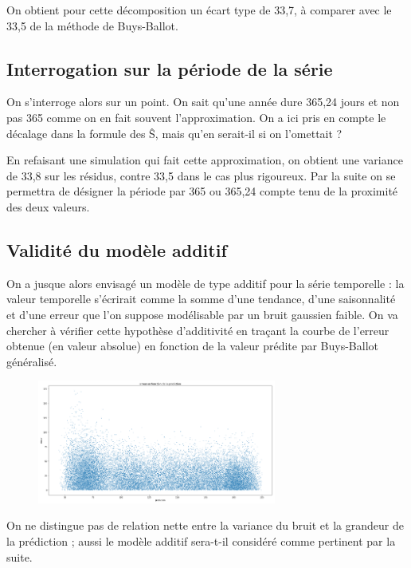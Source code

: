 \documentclass[../report.tex]{subfiles}
\begin{document}
\par On obtient pour cette décomposition un écart type de 33,7, à comparer avec le 33,5 de la méthode de Buys-Ballot.

\subsection{Interrogation sur la période de la série}

\par On s’interroge alors sur un point. On sait qu’une année dure 365,24 jours et non pas 365 comme on en fait souvent l’approximation. On a ici pris en compte le décalage dans la formule des Ŝ, mais qu’en serait-il si on l’omettait ? 

\par En refaisant une simulation qui fait cette approximation, on obtient une variance de 33,8 sur les résidus, contre 33,5 dans le cas plus rigoureux. Par la suite on se permettra de désigner la période par 365 ou 365,24 compte tenu de la proximité des deux valeurs.

\subsection{Validité du modèle additif}

\par On a jusque alors envisagé un modèle de type additif pour la série temporelle : la valeur temporelle s’écrirait comme la somme d’une tendance, d’une saisonnalité et d’une erreur que l’on suppose modélisable par un bruit gaussien faible. On va chercher à vérifier cette hypothèse d’additivité en traçant la courbe de l’erreur obtenue (en valeur absolue) en fonction de la valeur prédite par Buys-Ballot généralisé.

\begin{figure}[H]
  \centering
    \includegraphics[width=0.7\textwidth]{images/part_1/erreurfpred.png}
\end{figure}

\par On ne distingue pas de relation nette entre la variance du bruit et la grandeur de la prédiction ; aussi le modèle additif sera-t-il considéré comme pertinent par la suite.
\end{document}
